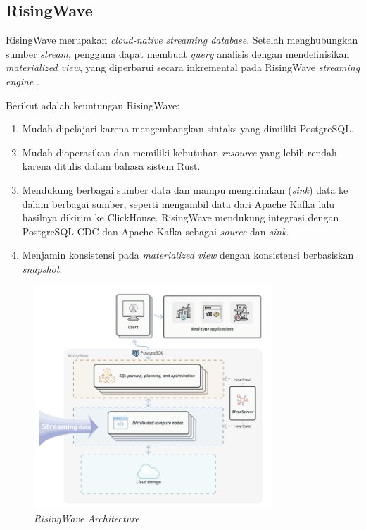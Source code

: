 \subsection{RisingWave}

RisingWave merupakan \textit{cloud-native streaming database}. Setelah menghubungkan sumber \textit{stream}, pengguna dapat membuat \textit{query} analisis dengan mendefinisikan \textit{materialized view}, yang diperbarui secara inkremental pada RisingWave \textit{streaming engine} \parencite{risingwave}.

Berikut adalah keuntungan RisingWave:

\begin{enumerate}
    \item Mudah dipelajari karena mengembangkan sintaks yang dimiliki PostgreSQL.
    \item Mudah dioperasikan dan memiliki kebutuhan \textit{resource} yang lebih rendah karena ditulis dalam bahasa sistem Rust.
    \item Mendukung berbagai sumber data dan mampu mengirimkan (\textit{sink}) data ke dalam berbagai sumber, seperti mengambil data dari Apache Kafka lalu hasilnya dikirim ke ClickHouse. RisingWave mendukung integrasi dengan PostgreSQL CDC dan Apache Kafka sebagai \textit{source} dan \textit{sink}.
    \item Menjamin konsistensi pada \textit{materialized view} dengan konsistensi berbasiskan \textit{snapshot}.
\end{enumerate}

\begin{figure}[ht]
    \centering
    \includegraphics[width=0.8\textwidth]{resources/chapter-2/risingwave.png}
    \caption{\textit{RisingWave Architecture \parencite{risingwave}}}
    \label{fig:risingwave-architecture}
\end{figure}

